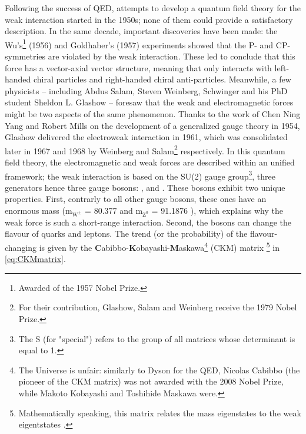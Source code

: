 Following the success of QED, attempts to develop a quantum field theory for the weak interaction started in the 1950s; none of them could provide a satisfactory description. In the same decade, important discoveries have been made: the Wu's\footnote{Awarded of the 1957 Nobel Prize.} (1956) and Goldhaber's (1957) experiments \cite{wuExperimentalTestParity1957}\cite{goldhaberHelicityNeutrinos1958} showed that the P- and CP-symmetries are violated by the weak interaction. These led to conclude that this force has a vector-axial vector structure, meaning that only interacts with left-handed chiral particles and right-handed chiral anti-particles. Meanwhile, a few physicists -- including Abdus Salam, Steven Weinberg, Schwinger and his PhD student Sheldon L. Glashow -- foresaw that the weak and electromagnetic forces might be two aspects of the same phenomenon. Thanks to the work of Chen Ning Yang and Robert Mills on the development of a generalized gauge theory in 1954, Glashow delivered the electroweak interaction in 1961, which was consolidated later in 1967 and 1968 by Weinberg and Salam\footnote{For their contribution, Glashow, Salam and Weinberg receive the 1979 Nobel Prize.} respectively. In this quantum field theory, the electromagnetic and weak forces are described within an unified framework; the weak interaction is based on the SU(2) gauge group\footnote{The S (for "special") refers to the group of all matrices whose determinant is equal to 1.}, three generators hence three gauge bosons: \rmWplus, \rmWminus and \rmZzero. These bosons exhibit two unique properties.  First, contrarly to all other gauge bosons, these ones have an enormous mass (m$_{\textrm{W}^{\pm}}$ = 80.377 \gmass and m$_{\textrm{Z}^{0}}$ = 91.1876 \gmass \cite{particledatagroupReviewParticlePhysics2022}), which explains why the weak force is such a short-range interaction. Second, the \rmWplusminus bosons can change the flavour of quarks and leptons. The trend (or the probability) of the flavour-changing is given by the \textbf{C}abibbo-\textbf{K}obayashi-\textbf{M}askawa\footnote{The Universe is unfair: similarly to Dyson for the QED, Nicolas Cabibbo (the pioneer of the CKM matrix) was not awarded with the 2008 Nobel Prize, while Makoto Kobayashi and Toshihide Maskawa were.} (CKM) matrix \cite{particledatagroupReviewParticlePhysics2022}\footnote{Mathematically speaking, this matrix relates the mass eigenstates to the weak eigentstates \cite{thomsonModernParticlePhysics2013}.} in \eq\ref{eq:CKMmatrix}.

